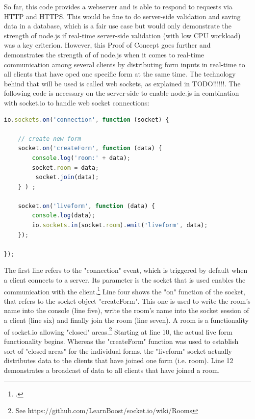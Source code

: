 So far, this code provides a webserver and is able to respond to requests via HTTP and HTTPS. This would be fine to do server-side validation and saving data in a database, which is a fair use case but would only demonstrate the strength of node.js if real-time server-side validation (with low CPU workload) was a key criterion. However, this Proof of Concept goes further and demonstrates the strength of of node.js when it comes to real-time communication among several clients by distributing form inputs in real-time to all clients that have oped one specific form at the same time. The technology behind that will be used is called web sockets, as explained in TODO!!!!!!. The following code is necessary on the server-side to enable node.js in combination with socket.io to handle web socket connections:

\begin{lstlisting}[language=javascript,caption={Using web sockets to distribute form inputs in real-time}]
io.sockets.on('connection', function (socket) {

    // create new form
    socket.on('createForm', function (data) {
        console.log('room:' + data);
        socket.room = data;
         socket.join(data);
    } ) ;

    socket.on('liveform', function (data) {
        console.log(data);
        io.sockets.in(socket.room).emit('liveform', data);
    });

});
\end{lstlisting}

The first line refers to the "connection" event, which is triggered by default when a client connects to a server. Its parameter is the socket that is used enables the communication with the client.\footcite[Cf.][197]{Roden_2012} Line four shows the "on" function of the socket, that refers to the socket object "createForm". This one is used to write the room's name into the console (line five), write the room's name into the socket session of a client (line six) and finally join the room (line seven). A room is a functionality of socket.io allowing "closed" areas.\footnote{See https://github.com/LearnBoost/socket.io/wiki/Rooms} Starting at line 10, the actual live form functionality begins. Whereas the "createForm" function was used to establish sort of "closed areas" for the individual forms, the "liveform" socket actually distributes data to the clients that have joined one form (i.e. room). Line 12 demonstrates a broadcast of data to all clients that have joined a room.\\

